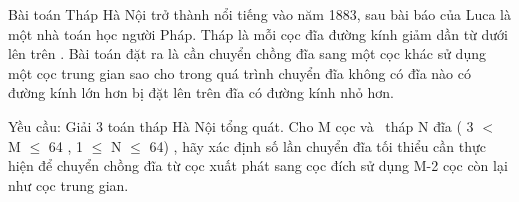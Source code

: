 Bài toán Tháp Hà Nội trở thành nổi tiếng vào năm 1883, sau bài báo của Luca là một nhà toán học người Pháp. Tháp là mỗi cọc đĩa đường kính giảm dần từ dưới lên trên . Bài toán đặt ra là cần chuyển chồng đĩa sang một cọc khác sử dụng một cọc trung gian sao cho trong quá trình chuyển đĩa không có đĩa nào có đường kính lớn hơn bị đặt lên trên đĩa có đường kính nhỏ hơn.  

   Yều cầu: Giải 3 toán tháp Hà Nội tổng quát. Cho M cọc và  tháp N đĩa ( 3 $<$ M  $\le$  64 , 1  $\le$  N  $\le$  64) , hãy xác định số lần chuyển đĩa tối thiểu cần thực hiện để chuyển chồng đĩa từ cọc xuất phát sang cọc đích sử dụng M-2 cọc còn lại như cọc trung gian.